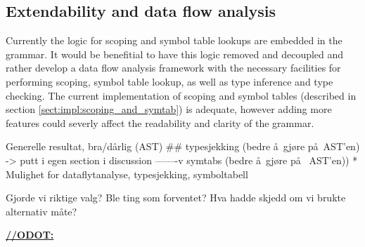 \subsection{Extendability and data flow analysis}
Currently the logic for scoping and symbol table lookups are embedded in the
grammar. It would be benefitial to have this logic removed and decoupled and
rather develop a data flow analysis framework with the necessary facilities for
performing scoping, symbol table lookup, as well as type inference and type
checking. The current implementation of scoping and symbol tables (described in
section \ref{sect:impl:scoping_and_symtab}) is adequate, however adding more
features could severly affect the readability and clarity of the grammar.

Generelle resultat, bra/d\aa rlig (AST) \#\# typesjekking (bedre \aa~gj\o re
p\aa~AST'en) -> putt i egen section i discussion -------v 
symtabs (bedre \aa~gj\o re p\aa~ AST'en))
 * Mulighet for dataflytanalyse, typesjekking, symboltabell

Gjorde vi riktige valg? Ble ting som forventet? Hva hadde skjedd om vi brukte alternativ m\aa te?

\underline{\textbf{\LARGE //ODOT:}}